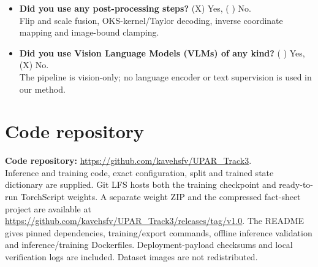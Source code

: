 \documentclass[a4paper,10pt,conference]{ieeeconf}
\begin{document}
\begin{itemize}
\item \textbf{Did you use any post-processing steps?} (X) Yes, ( ) No.\\
Flip and scale fusion, OKS-kernel/Taylor decoding, inverse coordinate mapping and image-bound clamping.

\item \textbf{Did you use Vision Language Models (VLMs) of any kind?} ( ) Yes, (X) No.\\
The pipeline is vision-only; no language encoder or text supervision is used in our method.
\end{itemize}

\section{Code repository}
\textbf{Code repository:} \url{https://github.com/kavehsfv/UPAR_Track3}.\\
Inference and training code, exact configuration, split and trained state dictionary are supplied. Git LFS hosts both the training checkpoint and ready-to-run TorchScript weights. A separate weight ZIP and the compressed fact-sheet project are available at \url{https://github.com/kavehsfv/UPAR_Track3/releases/tag/v1.0}. The README gives pinned dependencies, training/export commands, offline inference validation and inference/training Dockerfiles. Deployment-payload checksums and local verification logs are included. Dataset images are not redistributed.



\end{document}

